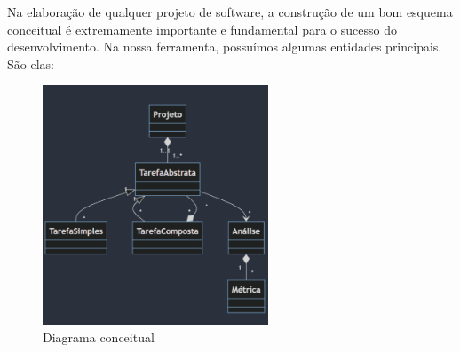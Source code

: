 \documentclass[12pt]{tcc}
\begin{document}
Na elaboração de qualquer projeto de software, a construção de um bom esquema conceitual é extremamente importante e fundamental para o sucesso do desenvolvimento. Na nossa ferramenta, possuímos algumas entidades principais. São elas:

\begin{figure}[!ht]
	\centering
	\includegraphics[width=0.6\textwidth]{figures/diagrama-conceitual.png}
	\caption{Diagrama conceitual}
	\label{fig:diag-conceitual}
\end{figure}
\end{document}
